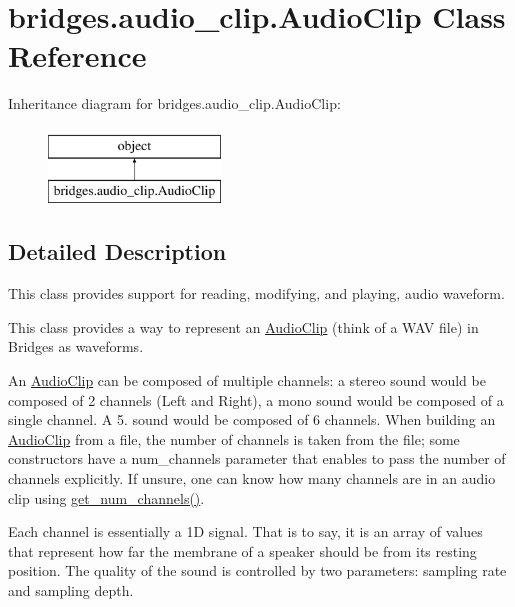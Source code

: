 \hypertarget{classbridges_1_1audio__clip_1_1_audio_clip}{}\section{bridges.\+audio\+\_\+clip.\+Audio\+Clip Class Reference}
\label{classbridges_1_1audio__clip_1_1_audio_clip}
Inheritance diagram for bridges.\+audio\+\_\+clip.\+Audio\+Clip\+:\begin{figure}[H]
\begin{center}
\leavevmode
\includegraphics[height=2.000000cm]{classbridges_1_1audio__clip_1_1_audio_clip}
\end{center}
\end{figure}


\subsection{Detailed Description}
This class provides support for reading, modifying, and playing, audio waveform. 

This class provides a way to represent an \hyperlink{classbridges_1_1audio__clip_1_1_audio_clip}{Audio\+Clip} (think of a W\+AV file) in Bridges as waveforms.

An \hyperlink{classbridges_1_1audio__clip_1_1_audio_clip}{Audio\+Clip} can be composed of multiple channels\+: a stereo sound would be composed of 2 channels (Left and Right), a mono sound would be composed of a single channel. A 5. sound would be composed of 6 channels. When building an \hyperlink{classbridges_1_1audio__clip_1_1_audio_clip}{Audio\+Clip} from a file, the number of channels is taken from the file; some constructors have a num\+\_\+channels parameter that enables to pass the number of channels explicitly. If unsure, one can know how many channels are in an audio clip using \hyperlink{classbridges_1_1audio__clip_1_1_audio_clip_af881900e292374fabf1f53a253571e5f}{get\+\_\+num\+\_\+channels()}.

Each channel is essentially a 1D signal. That is to say, it is an array of values that represent how far the membrane of a speaker should be from its resting position. The quality of the sound is controlled by two parameters\+: sampling rate and sampling depth.

